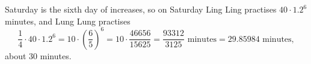 Saturday is the sixth day of increases, so on Saturday Ling Ling practises $40\cdot1.2^6$ minutes, and Lung Lung practises
\[\dfrac14\cdot40\cdot1.2^6=10\cdot\left(\dfrac65\right)^6=10\cdot\dfrac{46656}{15625}=\boxed{\dfrac{93312}{3125}\text{ minutes}}=29.85984\text{ minutes},\]
about $30$ minutes.
